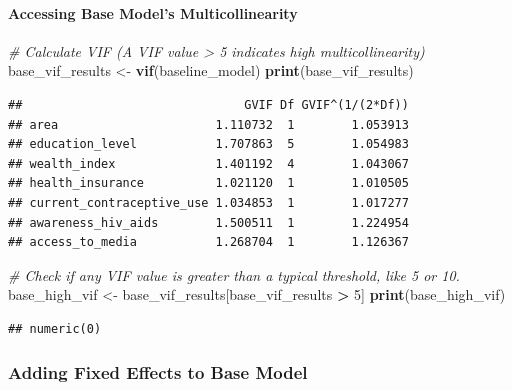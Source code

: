 \documentclass[
]{article}
\newenvironment{Shaded}{\begin{snugshade}}{\end{snugshade}}
\newcommand{\CommentTok}[1]{\textcolor[rgb]{0.56,0.35,0.01}{\textit{#1}}}
\newcommand{\DecValTok}[1]{\textcolor[rgb]{0.00,0.00,0.81}{#1}}
\newcommand{\FunctionTok}[1]{\textcolor[rgb]{0.13,0.29,0.53}{\textbf{#1}}}
\newcommand{\NormalTok}[1]{#1}
\newcommand{\OtherTok}[1]{\textcolor[rgb]{0.56,0.35,0.01}{#1}}
\newcommand{\SpecialCharTok}[1]{\textcolor[rgb]{0.81,0.36,0.00}{\textbf{#1}}}
\begin{document}
\hypertarget{accessing-base-models-multicollinearity}{%
\paragraph{Accessing Base Model's
Multicollinearity}\label{accessing-base-models-multicollinearity}}

\begin{Shaded}
\begin{Highlighting}[]
\CommentTok{\# Calculate VIF (A VIF value \textgreater{} 5 indicates high multicollinearity)}
\NormalTok{base\_vif\_results }\OtherTok{\textless{}{-}} \FunctionTok{vif}\NormalTok{(baseline\_model)}
\FunctionTok{print}\NormalTok{(base\_vif\_results)}
\end{Highlighting}
\end{Shaded}

\begin{verbatim}
##                               GVIF Df GVIF^(1/(2*Df))
## area                      1.110732  1        1.053913
## education_level           1.707863  5        1.054983
## wealth_index              1.401192  4        1.043067
## health_insurance          1.021120  1        1.010505
## current_contraceptive_use 1.034853  1        1.017277
## awareness_hiv_aids        1.500511  1        1.224954
## access_to_media           1.268704  1        1.126367
\end{verbatim}

\begin{Shaded}
\begin{Highlighting}[]
\CommentTok{\# Check if any VIF value is greater than a typical threshold, like 5 or 10.}
\NormalTok{base\_high\_vif }\OtherTok{\textless{}{-}}\NormalTok{ base\_vif\_results[base\_vif\_results }\SpecialCharTok{\textgreater{}} \DecValTok{5}\NormalTok{]}
\FunctionTok{print}\NormalTok{(base\_high\_vif)}
\end{Highlighting}
\end{Shaded}

\begin{verbatim}
## numeric(0)
\end{verbatim}

\hypertarget{adding-fixed-effects-to-base-model}{%
\subsubsection{Adding Fixed Effects to Base
Model}\label{adding-fixed-effects-to-base-model}}
\end{document}
